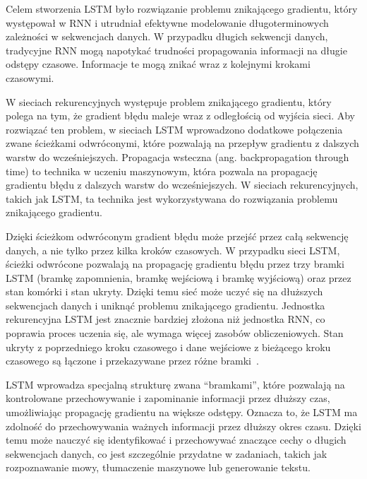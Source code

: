 Celem stworzenia LSTM było rozwiązanie problemu znikającego gradientu, który występował w RNN i utrudniał efektywne modelowanie długoterminowych zależności w sekwencjach danych. W przypadku długich sekwencji danych, tradycyjne RNN mogą napotykać trudności propagowania informacji na długie odstępy czasowe. Informacje te mogą znikać wraz z kolejnymi krokami czasowymi.

W sieciach rekurencyjnych występuje problem znikającego gradientu, który polega na tym, że gradient błędu maleje wraz z odległością od wyjścia sieci. Aby rozwiązać ten problem, w sieciach LSTM wprowadzono dodatkowe połączenia zwane ścieżkami odwróconymi, które pozwalają na przepływ gradientu z dalszych warstw do wcześniejszych. Propagacja wsteczna (ang. backpropagation through time) to technika w uczeniu maszynowym, która pozwala na propagację gradientu błędu z dalszych warstw do wcześniejszych. W sieciach rekurencyjnych, takich jak LSTM, ta technika jest wykorzystywana do rozwiązania problemu znikającego gradientu.

Dzięki ścieżkom odwróconym gradient błędu może przejść przez całą sekwencję danych, a nie tylko przez kilka kroków czasowych. W przypadku sieci LSTM, ścieżki odwrócone pozwalają na propagację gradientu błędu przez trzy bramki LSTM (bramkę zapomnienia, bramkę wejściową i bramkę wyjściową) oraz przez stan komórki i stan ukryty. Dzięki temu sieć może uczyć się na dłuższych sekwencjach danych i uniknąć problemu znikającego gradientu. Jednostka rekurencyjna LSTM jest znacznie bardziej złożona niż jednostka RNN, co poprawia proces uczenia się, ale wymaga więcej zasobów obliczeniowych. Stan ukryty z poprzedniego kroku czasowego i dane wejściowe z bieżącego kroku czasowego są łączone i przekazywane przez różne bramki~\cite{yu2019}.

LSTM wprowadza specjalną strukturę zwana \enquote{bramkami}, które pozwalają na kontrolowane przechowywanie i zapominanie informacji przez dłuższy czas, umożliwiając propagację gradientu na większe odstępy. Oznacza to, że LSTM ma zdolność do przechowywania ważnych informacji przez dłuższy okres czasu. Dzięki temu może nauczyć się identyfikować i przechowywać znaczące cechy o długich sekwencjach danych, co jest szczególnie przydatne w zadaniach, takich jak rozpoznawanie mowy, tłumaczenie maszynowe lub generowanie tekstu.

